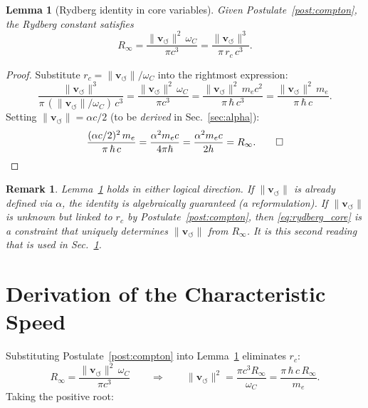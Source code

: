 \documentclass[aps,pra,preprint,longbibliography,nofootinbib]{revtex4-2}
\newtheorem{lemma}{Lemma}
\newtheorem{remark}{Remark}
\newcommand{\vnorm}{\lVert\mathbf{v}_{\!\boldsymbol{\circlearrowleft}}\rVert} %
\newcommand{\rc}{r_c}                            %
\newcommand{\omC}{\omega_C}                      %
\newcommand{\Rinf}{R_\infty}                     %
\begin{document}
\begin{lemma}[Rydberg identity in core variables]
\label{lem:rydberg}
Given Postulate~\ref{post:compton}, the Rydberg constant satisfies
\begin{equation}
  \Rinf = \frac{\vnorm^2\,\omC}{\pi c^3}
         = \frac{\vnorm^3}{\pi\,\rc\,c^3}.
  \label{eq:rydberg_core}
\end{equation}
\end{lemma}

\begin{proof}
Substitute $\rc = \vnorm/\omC$ into the rightmost expression:
\begin{equation}
  \frac{\vnorm^3}{\pi\,(\vnorm/\omC)\,c^3}
  = \frac{\vnorm^2\,\omC}{\pi c^3}
  = \frac{\vnorm^2\,m_e c^2}{\pi\,\hbar\,c^3}
  = \frac{\vnorm^2\,m_e}{\pi\,\hbar\,c}.
  \label{eq:rydberg_proof_step}
\end{equation}
Setting $\vnorm = \alpha c/2$ (to be \emph{derived} in Sec.~\ref{sec:alpha}):
\begin{equation}
  \frac{(\alpha c/2)^2\,m_e}{\pi\,\hbar\,c}
  = \frac{\alpha^2 m_e c}{4\pi\hbar}
  = \frac{\alpha^2 m_e c}{2h}
  = \Rinf. \qed
  \label{eq:rydberg_id_check}
\end{equation}
\end{proof}

\begin{remark}
\label{rem:rydberg_direction}
Lemma~\ref{lem:rydberg} holds in either logical direction.
If $\vnorm$ is already defined via $\alpha$, the identity is
algebraically guaranteed (a reformulation).
If $\vnorm$ is \emph{unknown} but linked to $\rc$ by
Postulate~\ref{post:compton}, then \eqref{eq:rydberg_core} is a
constraint that uniquely determines $\vnorm$ from $\Rinf$.
It is this second reading that is used in Sec.~\ref{sec:derivation}.
\end{remark}

\section{Derivation of the Characteristic Speed}
\label{sec:derivation}

Substituting Postulate~\ref{post:compton} into Lemma~\ref{lem:rydberg}
eliminates $\rc$:
\begin{equation}
  \Rinf = \frac{\vnorm^2\,\omC}{\pi c^3}
  \qquad\Longrightarrow\qquad
  \vnorm^2 = \frac{\pi c^3 \Rinf}{\omC}
         = \frac{\pi\,\hbar\,c\,\Rinf}{m_e}.
  \label{eq:vc_solve}
\end{equation}
Taking the positive root:
\end{document}
